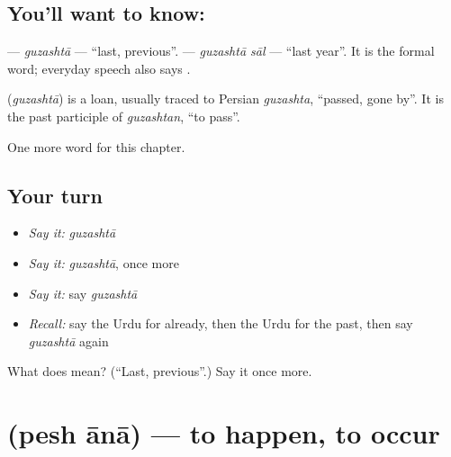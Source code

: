 \subsection*{You'll want to know: }
\textbf{} — \emph{guzashtā} — \textquotedblleft{}last, previous\textquotedblright{}. \textbf{ } — \emph{guzashtā sāl} — \textquotedblleft{}last year\textquotedblright{}. It is the formal word; everyday speech also says \textbf{}.

\begin{cousinweb}
\textbf{} (\emph{guzashtā}) is a loan, usually traced to Persian \emph{guzashta}, \textquotedblleft{}passed, gone by\textquotedblright{}. It is the past participle of \emph{guzashtan}, \textquotedblleft{}to pass\textquotedblright{}.
\end{cousinweb}

\begin{grammarlens}[title={What you've built}]
One more word for this chapter.
\end{grammarlens}

\subsection*{Your turn}
\begin{itemize}
\raggedright
  \item \emph{Say it:} \emph{guzashtā}
  \item \emph{Say it:} \emph{guzashtā}, once more
  \item \emph{Say it:} say \emph{guzashtā}
  \item \emph{Recall:} say the Urdu for already, then the Urdu for the past, then say \emph{guzashtā} again
\end{itemize}

\begin{tcolorbox}[breakable,colback=teal!4,colframe=teal!35!black,title={Before you move on}]
What does  mean? (\textquotedblleft{}Last, previous\textquotedblright{}.) Say it once more.
\end{tcolorbox}
\section[\texorpdfstring{\ur{پیش} \ur{آنا} (pesh ānā)}{پیش آنا (pesh ānā)}]{  (pesh ānā) — to happen, to occur}

\label{lesson:UR-C144-pesh-ana}




